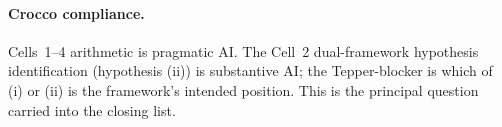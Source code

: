 \paragraph{Crocco compliance.}
Cells~1--4 arithmetic is pragmatic AI. The Cell~2 dual-framework hypothesis
identification (hypothesis (ii)) is substantive AI; the Tepper-blocker is
which of (i) or (ii) is the framework's intended position. This is the
principal question carried into the closing list.

